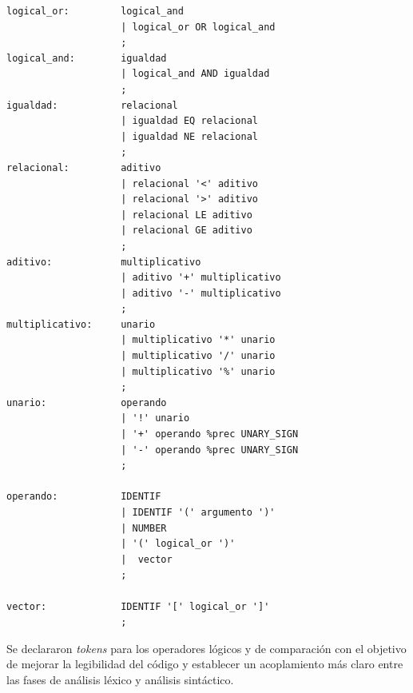 \documentclass[12pt,a4paper]{article}
\begin{document}
\begin{lstlisting}
logical_or:         logical_and                                         
                    | logical_or OR logical_and                         
                    ;
logical_and:        igualdad                                            
                    | logical_and AND igualdad                          
                    ;
igualdad:           relacional                                          
                    | igualdad EQ relacional                            
                    | igualdad NE relacional                            
                    ;
relacional:         aditivo                                             
                    | relacional '<' aditivo                            
                    | relacional '>' aditivo                            
                    | relacional LE aditivo                             
                    | relacional GE aditivo                             
                    ;
aditivo:            multiplicativo                                      
                    | aditivo '+' multiplicativo                        
                    | aditivo '-' multiplicativo                        
                    ;
multiplicativo:     unario                                              
                    | multiplicativo '*' unario                        
                    | multiplicativo '/' unario                         
                    | multiplicativo '%' unario                         
                    ;
unario:             operando                                            
                    | '!' unario                                        
                    | '+' operando %prec UNARY_SIGN                     
                    | '-' operando %prec UNARY_SIGN                      
                    ;

operando:           IDENTIF                                            
                    | IDENTIF '(' argumento ')'                         
                    | NUMBER                                            
                    | '(' logical_or ')'                                
                    |  vector                                           
                    ;

vector:             IDENTIF '[' logical_or ']'
                    ;
\end{lstlisting}
\noindent Se declararon \textit{tokens} para los operadores lógicos y de comparación con el objetivo 
de mejorar la legibilidad del código y establecer un acoplamiento más claro entre las fases de 
análisis léxico y análisis sintáctico.
\end{document}
